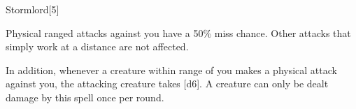 \begin{spellsection}{Stormlord}[5]
    \begin{spellheader}
    \end{spellheader}
    \begin{spellcontent}
        \begin{spelltargetinginfo}
        \end{spelltargetinginfo}
        \begin{spelleffects}
            \spelleffect Physical ranged attacks against you have a 50\% miss chance. Other attacks that simply work at a distance are not affected.

            In addition, whenever a creature within \rnglong range of you makes a physical attack against you, the attacking creature takes [d6].
            A creature can only be dealt damage by this spell once per round.
            \spelldur \durshort
        \end{spelleffects}
    \end{spellcontent}
    \begin{spellfooter}
        \miscastexplode
    \end{spellfooter}
    \begin{spellaugments}
    \end{spellaugments}
\end{spellsection}

